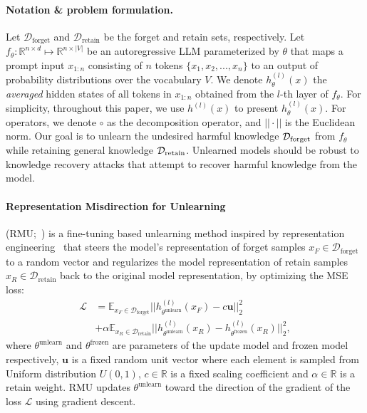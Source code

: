 \documentclass[letterpaper]{article} %
\begin{document}
\paragraph{Notation \& problem formulation.} 
Let $\mathcal{D}_{\text{forget}}$ and $\mathcal{D}_{\text{retain}}$ be the forget and retain sets, respectively. 
Let $f_{\theta}: \mathbb{R}^{n\times d} \mapsto \mathbb{R}^{n\times |V|}$ be an autoregressive LLM parameterized by $\theta$ that maps a prompt input $x_{1:n}$ consisting of $n$ tokens $\{x_1,x_2,...,x_n\}$ to an output of probability distributions over the vocabulary $V$. We denote $h_{\theta}^{(l)}(x)$ the \textit{averaged} hidden states of all tokens in $x_{1:n}$ obtained from the $l$-th layer of $f_{\theta}$. For simplicity, throughout this paper, we use $h^{(l)}(x)$ to present $h_{\theta}^{(l)}(x)$. For operators, we denote $\circ$ as the decomposition operator, and $||\cdot||$ is the Euclidean norm. Our goal is to unlearn the undesired harmful knowledge $\mathcal{D}_{\textnormal{forget}}$ from $f_{\theta}$ while retaining general knowledge 
$\mathcal{D}_{\textnormal{retain}}$. 
Unlearned models should be robust to knowledge recovery attacks that attempt to recover harmful knowledge from the model. 
\paragraph{Representation Misdirection for Unlearning} (RMU;~\citet{wmdp})  is a fine-tuning based unlearning method inspired by representation engineering~\cite{zou2023representation} that steers the model's representation of forget samples $x_F \in \mathcal{D}_\text{forget}$ to a random vector and regularizes the model representation of retain samples $x_R \in \mathcal{D}_\text{retain}$ back to the original model representation, by optimizing the MSE loss:
\begin{align}
    \mathcal{L} &= \mathbb{E}_{x_F\in\mathcal{D}_{\text{forget}}}||h_{\theta^{\text{unlearn}}}^{(l)}(x_F)-c\bm u||_2^2 \nonumber\\&+ \alpha \mathbb{E}_{x_R\in\mathcal{D}_{\text{retain}}}||h_{\theta^{\text{unlearn}}}^{(l)}(x_R)-h_{\theta^{\text{frozen}}}^{(l)}(x_R)||_2^2,\label{eq1}
\end{align}
where $\theta^{\text{unlearn}}$ and $\theta^{\text{frozen}}$ are parameters of the update model and frozen model respectively, $\bm u$ is a fixed random unit vector where each element is sampled from Uniform distribution $U(0,1)$, $c \in \mathbb{R}$ is a fixed scaling coefficient and $\alpha \in \mathbb{R}$ is a retain weight. RMU updates $\theta^{\text{unlearn}}$ toward the direction of the gradient of the loss $\mathcal{L}$ using gradient descent.
\end{document}

